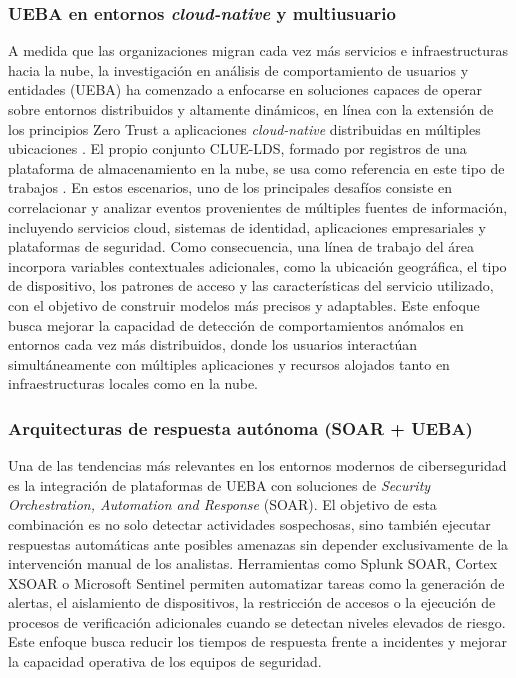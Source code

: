 \subsubsection{UEBA en entornos \emph{cloud-native} y multiusuario}
A medida que las organizaciones migran cada vez más servicios e infraestructuras hacia la nube, la investigación en análisis de comportamiento de usuarios y entidades (UEBA) ha comenzado a enfocarse en soluciones capaces de operar sobre entornos distribuidos y altamente dinámicos, en línea con la extensión de los principios Zero Trust a aplicaciones \emph{cloud-native} distribuidas en múltiples ubicaciones \parencite{NIST2023_800207A}. El propio conjunto CLUE-LDS, formado por registros de una plataforma de almacenamiento en la nube, se usa como referencia en este tipo de trabajos \parencite{Artioli2024}. En estos escenarios, uno de los principales desafíos consiste en correlacionar y analizar eventos provenientes de múltiples fuentes de información, incluyendo servicios cloud, sistemas de identidad, aplicaciones empresariales y plataformas de seguridad. Como consecuencia, una línea de trabajo del área incorpora variables contextuales adicionales, como la ubicación geográfica, el tipo de dispositivo, los patrones de acceso y las características del servicio utilizado, con el objetivo de construir modelos más precisos y adaptables. Este enfoque busca mejorar la capacidad de detección de comportamientos anómalos en entornos cada vez más distribuidos, donde los usuarios interactúan simultáneamente con múltiples aplicaciones y recursos alojados tanto en infraestructuras locales como en la nube.


\subsubsection{Arquitecturas de respuesta autónoma (SOAR + UEBA)}
Una de las tendencias más relevantes en los entornos modernos de ciberseguridad es la integración de plataformas de UEBA con soluciones de \emph{Security Orchestration, Automation and Response} (SOAR). El objetivo de esta combinación es no solo detectar actividades sospechosas, sino también ejecutar respuestas automáticas ante posibles amenazas sin depender exclusivamente de la intervención manual de los analistas. Herramientas como Splunk SOAR, Cortex XSOAR o Microsoft Sentinel permiten automatizar tareas como la generación de alertas, el aislamiento de dispositivos, la restricción de accesos o la ejecución de procesos de verificación adicionales cuando se detectan niveles elevados de riesgo. Este enfoque busca reducir los tiempos de respuesta frente a incidentes y mejorar la capacidad operativa de los equipos de seguridad.

